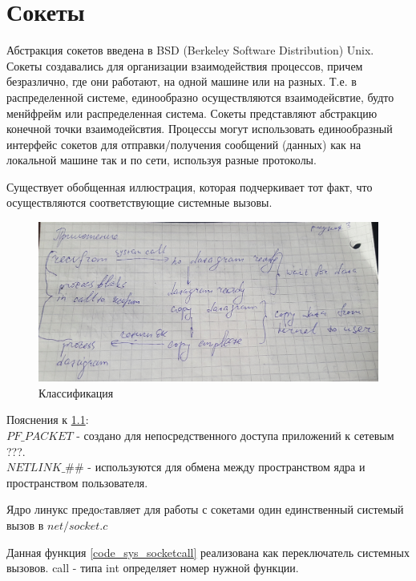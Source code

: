 \chapter{Сокеты}

Абстракция сокетов введена в BSD (Berkeley Software Distribution) Unix. Сокеты создавались для организации взаимодействия процессов, причем безразлично, где они работают, на одной машине или на разных. Т.е. в распределенной системе, единообразно осуществляются взаимодейсвтие, будто менйфрейм или распределенная система. Сокеты представляют абстракцию конечной точки взаимодейсвтия. Процессы могут использовать единообразный интерфейс сокетов для отправки/получения сообщений (данных) как на локальной машине так и по сети, используя разные протоколы. 

Существует обобщенная иллюстрация, которая подчеркивает тот факт, что осуществляются соответствующие системные вызовы.

 

\begin{figure}[H]
  \centering
  \includegraphics[width=\textwidth]{pic/1.png}
  \caption{Классификация}
  \label{pic_class_sockets}
\end{figure}

Пояснения к \ref{pic_class_sockets}:\\ 
$PF\_PACKET$ - создано для непосредственного доступа приложений к сетевым ???. \\
$NETLINK\_\#\#$ - используются для обмена между пространством ядра и пространством пользователя.

Ядро линукс предоcтавляет для работы с сокетами один единственный системый вызов в $net/socket.c$

 

Данная функция \ref{code_sys_socketcall} реализована как переключатель системных вызовов. 
call - типа int определяет номер нужной функции.

